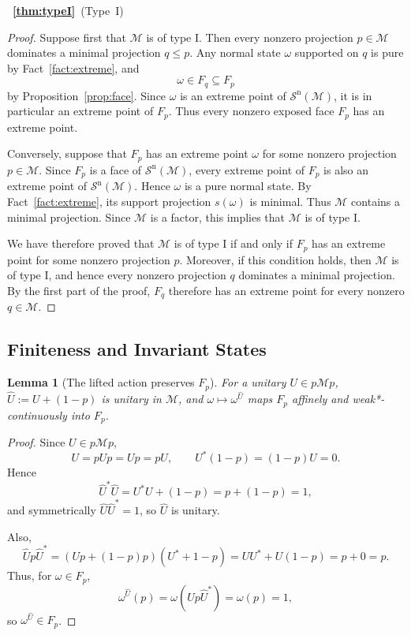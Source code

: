 \documentclass[11pt]{article}
\newtheorem{lemma}[theorem]{Lemma}
\newcommand{\Sn}{\mathcal{S}^{\mathrm n}}
\begin{document}
~{\bf \ref{thm:typeI}}~(Type~$\mathrm I$)
\begin{proof}
Suppose first that $\mathcal M$ is of type $\mathrm I$. Then every
nonzero projection $p\in\mathcal M$ dominates a minimal projection
$q\le p$. Any normal state $\omega$ supported on $q$ is pure by
Fact~\ref{fact:extreme}, and
\[
\omega\in F_q\subseteq F_p
\]
by Proposition~\ref{prop:face}. Since $\omega$ is an extreme point of
$\Sn(\mathcal M)$, it is in particular an extreme point of $F_p$.
Thus every nonzero exposed face $F_p$ has an extreme point.

Conversely, suppose that $F_p$ has an extreme point $\omega$ for some
nonzero projection $p\in\mathcal M$. Since $F_p$ is a face of
$\Sn(\mathcal M)$, every extreme point of $F_p$ is also an extreme
point of $\Sn(\mathcal M)$. Hence $\omega$ is a pure normal state.
By Fact~\ref{fact:extreme}, its support projection $s(\omega)$ is
minimal. Thus $\mathcal M$ contains a minimal projection. Since
$\mathcal M$ is a factor, this implies that $\mathcal M$ is of type
$\mathrm I$.

We have therefore proved that $\mathcal M$ is of type $\mathrm I$ if
and only if $F_p$ has an extreme point for some nonzero projection
$p$. Moreover, if this condition holds, then $\mathcal M$ is of type
$\mathrm I$, and hence every nonzero projection $q$ dominates a
minimal projection. By the first part of the proof, $F_q$ therefore
has an extreme point for every nonzero $q\in\mathcal M$.
\end{proof}
\subsection{Finiteness and Invariant States}

\begin{lemma}[The lifted action preserves $F_p$]
\label{lem:lift}
For a unitary $U\in p\mathcal Mp$, $\widehat U:=U+(1-p)$ is unitary in
$\mathcal M$, and $\omega\mapsto\omega^{\widehat U}$ maps $F_p$ affinely
and weak*-continuously into $F_p$.
\end{lemma}

\begin{proof}
Since $U\in p\mathcal Mp$,
\[
U=pUp=Up=pU,
\qquad
U^*(1-p)=(1-p)U=0.
\]
Hence
\[
\widehat U^*\widehat U
=
U^*U+(1-p)
=
p+(1-p)
=
1,
\]
and symmetrically $\widehat U\widehat U^*=1$, so $\widehat U$ is unitary.

Also,
\[
\widehat Up\widehat U^*
=
(Up+(1-p)p)(U^*+1-p)
=
UU^*+U(1-p)
=
p+0
=
p.
\]
Thus, for $\omega\in F_p$,
\[
\omega^{\widehat U}(p)
=
\omega(\widehat Up\widehat U^*)
=
\omega(p)
=
1,
\]
so $\omega^{\widehat U}\in F_p$.
\end{proof}
\end{document}
